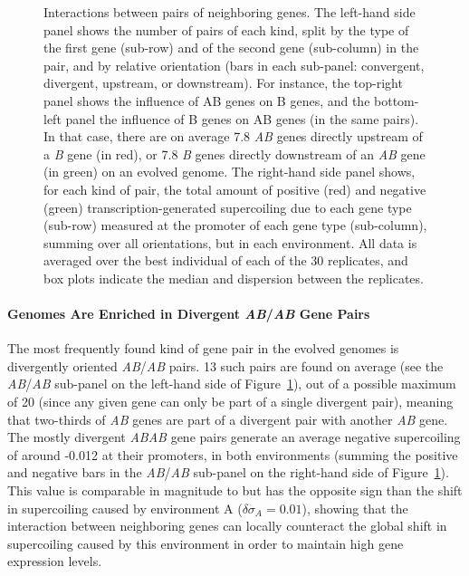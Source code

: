 \begin{figure}[H]
	\centering
	\begin{elasticrow}[width=\linewidth, sep=1em]
	\end{elasticrow}
\caption[Number of gene pairs and supercoiling effect per type of gene pair]{Interactions between pairs of neighboring genes.
The left-hand side panel shows the number of pairs of each kind, split by the type of the first gene (sub-row) and of the second gene (sub-column) in the pair, and by relative orientation (bars in each sub-panel: convergent, divergent, upstream, or downstream).
For instance, the top-right panel shows the influence of AB genes on B genes, and the bottom-left panel the influence of B genes on AB genes (in the same pairs).
In that case, there are on average 7.8 \emph{AB} genes directly upstream of a \emph{B} gene (in red), or 7.8 \emph{B} genes directly downstream of an \emph{AB} gene (in green) on an evolved genome.
The right-hand side panel shows, for each kind of pair, the total amount of positive (red) and negative (green) transcription-generated supercoiling due to each gene type (sub-row) measured at the promoter of each gene type (sub-column), summing over all orientations, but in each environment.
All data is averaged over the best individual of each of the 30 replicates, and box plots indicate the median and dispersion between the replicates.}
\label{fig:ploscb:pair_results}
\end{figure}

\paragraph{Genomes Are Enriched in Divergent \emph{AB}/\emph{AB} Gene Pairs}
The most frequently found kind of gene pair in the evolved genomes is divergently oriented \emph{AB}/\emph{AB} pairs.
13 such pairs are found on average (see the \emph{AB}/\emph{AB} sub-panel on the left-hand side of Figure~\ref{fig:ploscb:pair_results}), out of a possible maximum of 20 (since any given gene can only be part of a single divergent pair), meaning that two-thirds of \emph{AB} genes are part of a divergent pair with another \emph{AB} gene.
The mostly divergent \emph{AB}\emph{AB} gene pairs generate an average negative supercoiling of around -0.012 at their promoters, in both environments (summing the positive and negative bars in the \emph{AB}/\emph{AB} sub-panel on the right-hand side of Figure~\ref{fig:ploscb:pair_results}).
This value is comparable in magnitude to but has the opposite sign than the shift in supercoiling caused by environment A ($\delta\sigma_A = 0.01$), showing that the interaction between neighboring genes can locally counteract the global shift in supercoiling caused by this environment in order to maintain high gene expression levels.

